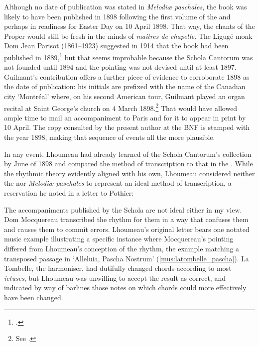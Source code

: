 Although no date of publication was stated in \emph{Melodiæ paschales}, the book was likely to have been published in 1898 following the first volume of the \ldo{} and perhaps in readiness for Easter Day on 10 April 1898.
That way, the chants of the Proper would still be fresh in the minds of \emph{maîtres de chapelle}.
The Ligugé monk Dom Jean Parisot (1861--1923) suggested in 1914 that the book had been published in 1889,\footcite[34]{Parisotaccompagnementmodalchant1914} but that seems improbable because the Schola Cantorum was not founded until 1894 and the pointing was not devised until at least 1897.
Guilmant's contribution offers a further piece of evidence to corroborate 1898 as the date of publication: his initials are prefixed with the name of the Canadian city `Montréal' where, on his second American tour, Guilmant played an organ recital at Saint George's church on 4 March 1898.\footnote{See \cite{ProgrammeOrganRecital1898}.}
That would have allowed ample time to mail an accompaniment to Paris and for it to appear in print by 10 April.
The copy consulted by the present author at the BNF is stamped with the year 1898, making that sequence of events all the more plausible.

In any event, Lhoumeau had already learned of the Schola Cantorum's collection by June of 1898 and compared the method of transcription to that in the \ldo{}.
While the rhythmic theory evidently aligned with his own, Lhoumeau considered neither the \ldo{} nor \emph{Melodiæ paschales} to represent an ideal method of transcription, a reservation he noted in a letter to Pothier:

  {\label{fn:lhoumeau_schola}}
{The accompaniments published by the Schola are not ideal either in my view. Dom Mocquereau transcribed the rhythm for them in a way that confuses them and causes them to commit errors.}
\noindent
Lhoumeau's original letter bears one notated music example illustrating a specific instance where Mocquereau's pointing differed from Lhoumeau's conception of the rhythm, the example matching a transposed passage in `Alleluia, Pascha Nostrum' (\cref{mus:latombelle_pascha}).
La Tombelle, the harmoniser, had dutifully changed chords according to most \emph{ictuses}, but Lhoumeau was unwilling to accept the result as correct, and indicated by way of barlines those notes on which chords could more effectively have been changed.

